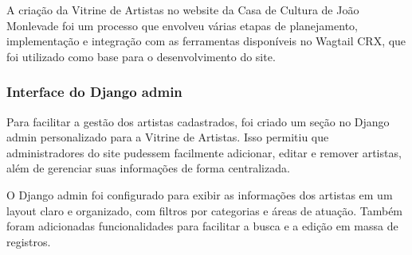 A criação da Vitrine de Artistas no website da Casa de Cultura de João Monlevade foi um processo que envolveu várias etapas de planejamento, implementação e integração com as ferramentas disponíveis no Wagtail CRX, que foi utilizado como base para o desenvolvimento do site.


\subsubsection{Interface do Django admin}

Para facilitar a gestão dos artistas cadastrados, foi criado um seção no Django admin personalizado para a Vitrine de Artistas. Isso permitiu que administradores do site pudessem facilmente adicionar, editar e remover artistas, além de gerenciar suas informações de forma centralizada.

O Django admin foi configurado para exibir as informações dos artistas em um layout claro e organizado, com filtros por categorias e áreas de atuação. Também foram adicionadas funcionalidades para facilitar a busca e a edição em massa de registros.


